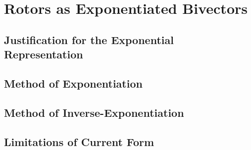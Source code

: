 \chapter{Rotors as Exponentiated Bivectors}

\section{Justification for the Exponential Representation}
\section{Method of Exponentiation}
\section{Method of Inverse-Exponentiation}
\section{Limitations of Current Form}

